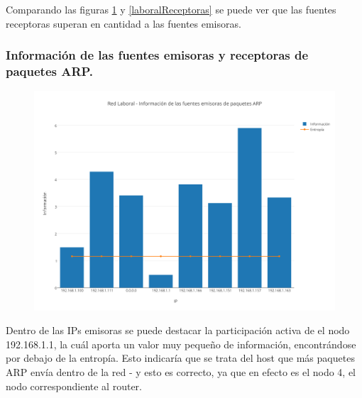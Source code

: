 Comparando las figuras \ref{laboralEmisoras} y \ref{laboralReceptoras} se puede ver que las fuentes receptoras superan en cantidad a las fuentes emisoras.\\

\subsubsection{Informaci\'on de las fuentes emisoras y receptoras de paquetes ARP.}

\begin{figure}[h!]
    \centering                                                       
    \includegraphics[width=400pt]{img/RedLaboralFuentesEmisorasARP}
    \caption{}
    \label{laboralEmisoras}
\end{figure}

Dentro de las IPs emisoras se puede destacar la participaci\'on activa de el nodo 192.168.1.1, la cu\'al aporta un valor muy pequeño de informaci\'on, encontr\'andose por debajo de la entrop\'ia. Esto indicar\'ia que se trata del host que m\'as paquetes ARP env\'ia dentro de la red - y esto es correcto, ya que en efecto es el nodo 4, el nodo correspondiente al router.\\

